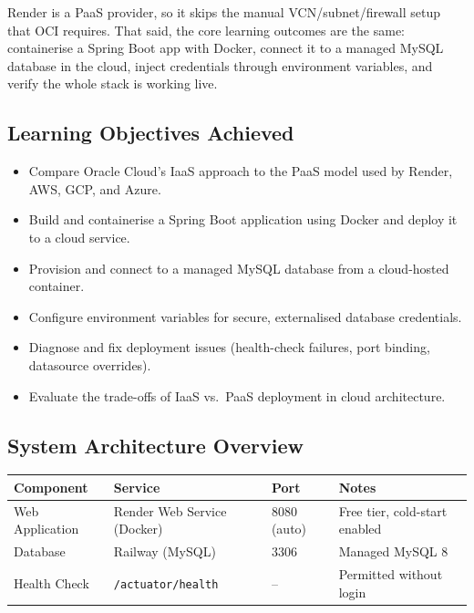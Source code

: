 \documentclass[11pt,letterpaper]{article}
\begin{document}
Render is a PaaS provider, so it skips the manual VCN/subnet/firewall setup that OCI requires. That said, the core learning outcomes are the same: containerise a Spring Boot app with Docker, connect it to a managed MySQL database in the cloud, inject credentials through environment variables, and verify the whole stack is working live.

\subsection{Learning Objectives Achieved}

\begin{itemize}[nosep]
  \item Compare Oracle Cloud's IaaS approach to the PaaS model used by Render, AWS, GCP, and Azure.
  \item Build and containerise a Spring Boot application using Docker and deploy it to a cloud service.
  \item Provision and connect to a managed MySQL database from a cloud-hosted container.
  \item Configure environment variables for secure, externalised database credentials.
  \item Diagnose and fix deployment issues (health-check failures, port binding, datasource overrides).
  \item Evaluate the trade-offs of IaaS vs.\ PaaS deployment in cloud architecture.
\end{itemize}

\subsection{System Architecture Overview}

\begin{center}
\begin{tabular}{llll}
\toprule
\textbf{Component} & \textbf{Service} & \textbf{Port} & \textbf{Notes} \\
\midrule
Web Application & Render Web Service (Docker) & 8080 (auto) & Free tier, cold-start enabled \\
Database         & Railway (MySQL)              & 3306        & Managed MySQL 8              \\
Health Check     & \texttt{/actuator/health}    & --          & Permitted without login      \\
\bottomrule
\end{tabular}
\end{center}
\end{document}
